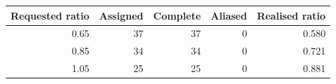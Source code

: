 \begin{tabular}{rrrrr}
\toprule
Requested ratio & Assigned & Complete & Aliased & Realised ratio \\
\midrule
0.65 & 37 & 37 & 0 & 0.580 \\
0.85 & 34 & 34 & 0 & 0.721 \\
1.05 & 25 & 25 & 0 & 0.881 \\
\bottomrule
\end{tabular}
